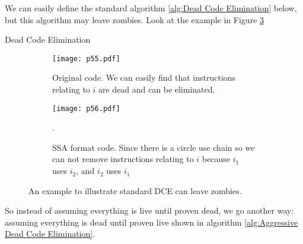 We can easily define the standard algorithm \ref{alg:Dead Code Elimination} below, but this algorithm may leave zombies. 
Look at the example in Figure \ref{fig:p55-56}


\begin{algorithm}[H]
    \caption{Dead Code Elimination}\label{alg:Dead Code Elimination}
    \begin{algorithmic}
        \EndIf
        \EndIf
        \EndIf
        \EndFor
        \EndWhile
    \end{algorithmic}
    \end{algorithm}


\begin{figure}[H]
     \centering
     \begin{subfigure}{0.4\textwidth}
     \centering
         \texttt{[image: p55.pdf]}
         \caption{Original code. We can easily find that instructions relating to $i$ are dead and can be eliminated.}
         \label{fig:pp55}
     \end{subfigure}
     \begin{subfigure}{0.4\textwidth}
     \centering
         \texttt{[image: p56.pdf]}
         \caption{SSA format code. Since there is a circle use chain so we can not remove instructions relating to $i$ because $i_1$ uses $i_2$, and $i_2$ uses $i_1$}.
         \label{fig:p56}
     \end{subfigure}


     \caption{An example to illustrate standard DCE can leave zombies.}
        \label{fig:p55-56}
\end{figure}

So instead of assuming everything is live until proven dead, we go another way: assuming everything is dead until proven live 
shown in algorithm \ref{alg:Aggressive Dead Code Elimination}. 



